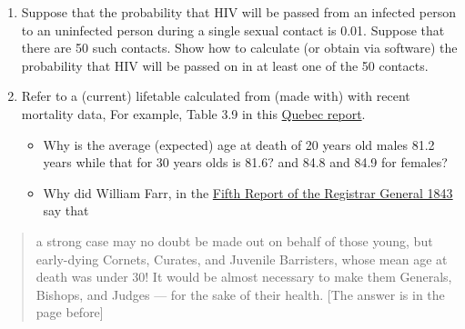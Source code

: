 \documentclass[]{book}
\providecommand{\tightlist}{%
  \setlength{\itemsep}{0pt}\setlength{\parskip}{0pt}}
\begin{document}
\begin{enumerate}
\item
  Suppose that the probability that HIV will be passed from an infected person to an uninfected person during a single sexual contact is 0.01. Suppose that there are 50 such contacts.
  Show how to calculate (or obtain via software) the probability that HIV will be passed on in at least one of the 50 contacts.
\item
  Refer to a (current) lifetable calculated from (made with) with recent mortality data, For example, Table 3.9 in this \href{https://www.stat.gouv.qc.ca/statistiques/population-demographie/bilan2019.pdf\#page=83}{Quebec report}.

  \begin{itemize}
  \tightlist
  \item
    Why is the average (expected) age at death of 20 years old males 81.2 years while that for 30 years olds is 81.6? and 84.8 and 84.9 for females?
  \item
    Why did William Farr, in the \href{http://www.medicine.mcgill.ca/epidemiology/hanley/Reprints/3FRIAS2016_Session1_Invited1_Hanley.pdf\#page=119}{Fifth Report of the Registrar General 1843} say that
  \end{itemize}
\end{enumerate}

\begin{quote}
a strong case may no doubt be made out on behalf of those young, but early-dying Cornets, Curates, and Juvenile Barristers, whose mean age at death was under 30! It would be almost necessary to make them Generals, Bishops, and Judges --- for the sake of their health. {[}The answer is in the page before{]}
\end{quote}
\end{document}
